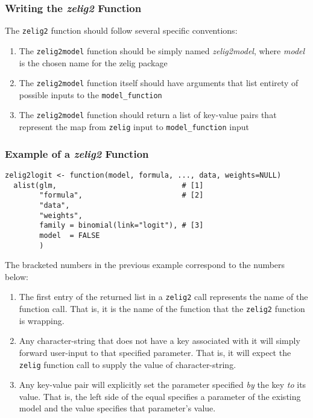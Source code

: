 \subsubsection{Writing the \emph{zelig2} Function}

The {\tt zelig2} function should follow several specific conventions:

\begin{enumerate}
	\item{The {\tt zelig2model} function should be simply named \emph{zelig2model}, where \emph{model} is the chosen name for the zelig package}
	\item{The {\tt zelig2model} function itself should have arguments that list entirety of possible inputs to the {\tt model\_function}}
	\item{The {\tt zelig2model} function should return a list of key-value pairs that represent the map from {\tt zelig} input to {\tt model\_function} input}
\end{enumerate}


\subsubsection{Example of a \emph{zelig2} Function}

\begin{verbatim}
zelig2logit <- function(model, formula, ..., data, weights=NULL)
  alist(glm,                             # [1]
        "formula",                       # [2]
        "data",
        "weights",
        family = binomial(link="logit"), # [3]
        model  = FALSE
        )
\end{verbatim}

The bracketed numbers in the previous example correspond to the numbers below:

\begin{enumerate}
	\item{The first entry of the returned list in a {\tt zelig2} call represents the name of the function call.  That is, it is the name of the function that the {\tt zelig2} function is wrapping.}
	\item{Any character-string that does not have a key associated with it will simply forward user-input to that specified parameter.  That is, it will expect the {\tt zelig} function call to supply the value of character-string.}
	\item{Any key-value pair will explicitly set the parameter specified \emph{by} the key \emph{to} its value.  That is, the left side of the equal specifies a parameter of the existing model and the value specifies that parameter's value.}
\end{enumerate}

